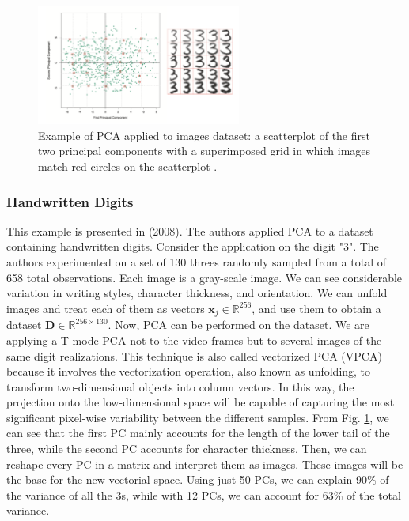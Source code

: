 \begin{figure}
    \centering
    \includegraphics[width = 0.6\textwidth]{Images/pc3.png}
    \caption[Example of PCA of images.]{Example of PCA applied to images dataset: a scatterplot of the first two principal components with a superimposed grid in which images match red circles on the scatterplot \cite{tibshirani_elements_2008}.}
    \label{fig:principal3}
\end{figure}
\subsubsection{Handwritten Digits}
This example is presented in \citeauthor{tibshirani_elements_2008} (2008).
The authors applied PCA to a dataset containing handwritten digits. Consider the application on the digit "3". The authors experimented on a set of 130 threes randomly sampled from a total of 658 total observations. Each image is a  gray-scale image. We can see considerable variation in writing styles, character thickness, and orientation. We can unfold images and treat each of them as vectors $\textbf{x}_j \in \mathbb{R}^{256}$, and use them to obtain a dataset $\mathbf{D} \in \mathbb{R}^{256\times 130}$. Now, PCA can be performed on the dataset. We are applying a T-mode PCA not to the video frames but to several images of the same digit realizations. This technique is also called vectorized PCA (VPCA) because it involves the vectorization operation, also known as unfolding, to transform two-dimensional objects into column vectors. In this way, the projection onto the low-dimensional space will be capable of capturing the most significant pixel-wise variability between the different samples. From Fig. \ref{fig:principal3}, we can see that the first PC mainly accounts for the length of the lower tail of the three, while the second PC accounts for character thickness. Then, we can reshape every PC in a matrix and interpret them as images. These images will be the base for the new vectorial space. Using just 50 PCs, we can explain 90\% of the variance of all the 3s, while with 12 PCs, we can account for 63\% of the total variance.
